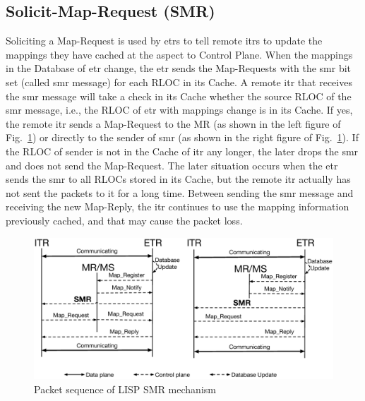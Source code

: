 \subsection{Solicit-Map-Request (SMR)}
\label{sec:SMR}
Soliciting a Map-Request is used by \acrshort{etr}s to tell remote \acrshort{itr}s to update the mappings they have cached at the aspect to Control Plane. When the mappings in the Database of \acrshort{etr} change, the \acrshort{etr} sends the Map-Requests with the \acrshort{smr} bit set (called \acrfull{smr} message) for each RLOC in its Cache. A remote \acrshort{itr} that receives the \acrshort{smr} message will take a check in its Cache whether the source RLOC of the \acrshort{smr} message, i.e., the RLOC of \acrshort{etr} with mappings change is in its Cache. If yes, the remote \acrshort{itr} sends a Map-Request to the MR (as shown in the left figure of Fig.~\ref{SMR_schema}) or directly to the sender of \acrshort{smr} (as shown in the right figure of Fig.~\ref{SMR_schema}). %
If the RLOC of sender is not in the Cache of \acrshort{itr} any longer, the later drops the \acrshort{smr} and does not send the Map-Request. The later situation occurs when the \acrshort{etr} sends the \acrshort{smr} to all RLOCs stored in its Cache, but the remote \acrshort{itr} actually has not sent the packets to it for a long time. Between sending the \acrshort{smr} message and receiving the new Map-Reply, the \acrshort{itr} continues to use the mapping information previously cached, and that may cause the packet loss.
\begin{figure}[!t]
	\centering
	\includegraphics[width=\textwidth]{Pics/SMR_schema.eps}
	\caption{Packet sequence of LISP SMR mechanism}
	\label{SMR_schema}
\end{figure}


